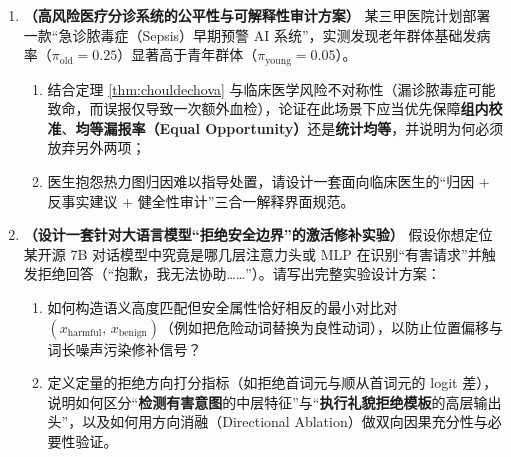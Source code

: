 \begin{enumerate}[label=\textbf{7.4.\arabic*}, start=7]
  \item \textbf{（高风险医疗分诊系统的公平性与可解释性审计方案）} 某三甲医院计划部署一款“急诊脓毒症（Sepsis）早期预警 AI 系统”，实测发现老年群体基础发病率（$\pi_{\text{old}} = 0.25$）显著高于青年群体（$\pi_{\text{young}} = 0.05$）。
  \begin{enumerate}
    \item 结合定理 \ref{thm:chouldechova} 与临床医学风险不对称性（漏诊脓毒症可能致命，而误报仅导致一次额外血检），论证在此场景下应当优先保障\textbf{组内校准}、\textbf{均等漏报率（Equal Opportunity）}还是\textbf{统计均等}，并说明为何必须放弃另外两项；
    \item 医生抱怨热力图归因难以指导处置，请设计一套面向临床医生的“归因 + 反事实建议 + 健全性审计”三合一解释界面规范。
  \end{enumerate}

  \item \textbf{（设计一套针对大语言模型“拒绝安全边界”的激活修补实验）} 假设你想定位某开源 7B 对话模型中究竟是哪几层注意力头或 MLP 在识别“有害请求”并触发拒绝回答（``抱歉，我无法协助……''）。请写出完整实验设计方案：
  \begin{enumerate}
    \item 如何构造语义高度匹配但安全属性恰好相反的最小对比对 $(x_{\text{harmful}},\, x_{\text{benign}})$（例如把危险动词替换为良性动词），以防止位置偏移与词长噪声污染修补信号？
    \item 定义定量的拒绝方向打分指标（如拒绝首词元与顺从首词元的 logit 差），说明如何区分“\textbf{检测有害意图}的中层特征”与“\textbf{执行礼貌拒绝模板}的高层输出头”，以及如何用方向消融（Directional Ablation）做双向因果充分性与必要性验证。
  \end{enumerate}
\end{enumerate}
